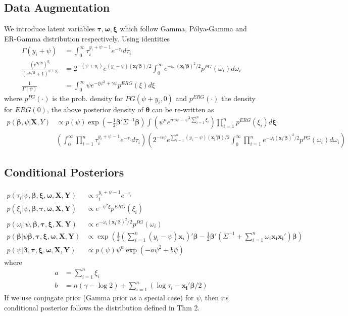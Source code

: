 \documentclass[11pt, oneside]{article}
\begin{document}
\subsection{Data Augmentation}
We introduce latent variables $\bm{\tau, \omega, \xi}$ which follow Gamma, P\'olya-Gamma and ER-Gamma distribution respectively. Using identities
\begin{align}
\Gamma(y_i + \psi) &= \int_0^\infty \tau_i^{y_i + \psi-1} e^{-\tau_i} d\tau_i \\
\frac{\left(e^{\bm{x_i'\beta}}\right)^{y_i} }{\left(e^{\bm{x_i'\beta} } + 1\right)^{\psi + y_i}} &= 2^{-(\psi + y_i)} e^{(y_i-\psi)(\bm{x_i'\beta} )/2} \int_0^\infty e^{-\omega_i (\bm{x_i'\beta} )^2/2} p^{PG}(\omega_i) d\omega_i \\
\frac{1}{\Gamma(\psi)} &= \int_0^\infty \psi e^{-\xi \psi^2 + \gamma\psi} p^{ERG}(\xi) d\xi
\end{align}
where $p^{PG}(\cdot)$ is the prob. density for $PG(\psi + y_i, 0)$ and $p^{ERG}(\cdot) $ the density for $ERG(0)$, the above posterior density of $\bm\theta$ can be re-written as 
\begin{align}
p({\bm \beta}, \psi | {\bm X, Y}) &\propto p(\psi) \exp\left(-\frac{1}{2} \bm{\beta'} \Sigma^{-1} {\bm\beta}\right) \int (\psi^n e^{n\gamma\psi-\psi^2\sum_{i=1}^n \xi_i }) \prod_{i=1}^np^{ERG}(\xi_i) d\bm\xi \\
& \left(\int_0^\infty \prod_{i=1}^n  \tau_i^{y_i + \psi-1} e^{-\tau_i} d\tau_i\right) \left(2^{-n\psi}e^{\sum_{i=1}^n  (y_i-\psi)(\bm{x_i'\beta})/2} \int_0^\infty \prod_{i=1}^ne^{-\omega_i (\bm{x_i'\beta})^2/2} p^{PG}(\omega_i) d\omega_i \right)
\end{align}

\subsection{Conditional Posteriors}
\begin{align}
p(\tau_i | \psi, \bm{\beta, \xi, \omega, X, Y}) &\propto \tau_i^{y_i + \psi-1} e^{-\tau_i} \\
p(\xi_i | \psi, \bm{\beta, \tau, \omega, X, Y}) &\propto e^{-\psi^2 \xi} p^{ERG}(\xi_i) \\
p(\omega_i | \psi, \bm{\beta, \tau, \xi, X, Y}) &\propto e^{-\omega_i (\bm{x_i'\beta})^2/2} p^{PG}(\omega_i) \\
p(\bm\beta | \psi \bm{\beta, \tau, \xi, \omega, X, Y})  &\propto \exp\left(\frac{1}{2}\left(\sum_{i=1}^n(y_i-\psi)\bm{x}_i\right)'\bm\beta - \frac{1}{2} \bm{\beta}'\left(\Sigma^{-1} + \sum_{i=1}^n\omega_i \bm{x_ix_i'}\right) \bm\beta \right)  \\
p(\psi | \bm{\beta, \tau, \xi, \omega, X, Y}) 
&\propto p(\psi) \psi^n \exp\left(-  a \psi^2 + b \psi \right) 
\end{align}
where 
\begin{align}
a &= \sum_{i=1}^n \xi_i\\
b &= n(\gamma-\log2) + \sum_{i=1}^n \left( \log\tau_i - \bm{x_i'\beta}/2 \right)
\end{align}
If we use conjugate prior (Gamma prior as a special case) for $\psi$, then its conditional posterior follows the distribution defined in Thm 2.
\end{document}
